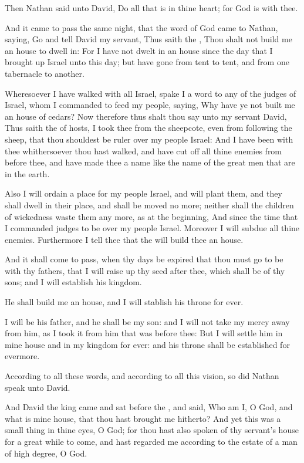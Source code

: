 \verse Then Nathan said unto David, Do all that is in thine heart; for God is with thee.

\verse And it came to pass the same night, that the word of God came to Nathan, saying, \verse Go and tell David my servant, Thus saith the \LORD, Thou shalt not build me an house to dwell in: \verse For I have not dwelt in an house since the day that I brought up Israel unto this day; but have gone from tent to tent, and from one tabernacle to another.

\verse Wheresoever I have walked with all Israel, spake I a word to any of the judges of Israel, whom I commanded to feed my people, saying, Why have ye not built me an house of cedars?  \verse Now therefore thus shalt thou say unto my servant David, Thus saith the \LORD of hosts, I took thee from the sheepcote, even from following the sheep, that thou shouldest be ruler over my people Israel: \verse And I have been with thee whithersoever thou hast walked, and have cut off all thine enemies from before thee, and have made thee a name like the name of the great men that are in the earth.

\verse Also I will ordain a place for my people Israel, and will plant them, and they shall dwell in their place, and shall be moved no more; neither shall the children of wickedness waste them any more, as at the beginning, \verse And since the time that I commanded judges to be over my people Israel. Moreover I will subdue all thine enemies.  Furthermore I tell thee that the \LORD will build thee an house.

\verse And it shall come to pass, when thy days be expired that thou must go to be with thy fathers, that I will raise up thy seed after thee, which shall be of thy sons; and I will establish his kingdom.

\verse He shall build me an house, and I will stablish his throne for ever.

\verse I will be his father, and he shall be my son: and I will not take my mercy away from him, as I took it from him that was before thee: \verse But I will settle him in mine house and in my kingdom for ever: and his throne shall be established for evermore.

\verse According to all these words, and according to all this vision, so did Nathan speak unto David.

\verse And David the king came and sat before the \LORD, and said, Who am I, O \LORD God, and what is mine house, that thou hast brought me hitherto?  \verse And yet this was a small thing in thine eyes, O God; for thou hast also spoken of thy servant's house for a great while to come, and hast regarded me according to the estate of a man of high degree, O \LORD God.

